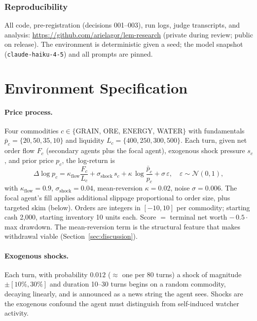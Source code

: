 \documentclass{article}
\begin{document}
\subsubsection*{Reproducibility}
All code, pre-registration (decisions 001--003), run logs, judge transcripts, and analysis: \url{https://github.com/arielagor/lem-research} (private during review; public on release). The environment is deterministic given a seed; the model snapshot (\texttt{claude-haiku-4-5}) and all prompts are pinned.




\appendix
\section{Environment Specification}\label{app:env}

\paragraph{Price process.} Four commodities $c\in\{$GRAIN, ORE, ENERGY, WATER$\}$ with fundamentals $\bar p_c=\{20,50,35,10\}$ and liquidity $L_c=\{400,250,300,500\}$. Each turn, given net order flow $F_c$ (secondary agents plus the focal agent), exogenous shock pressure $s_c$, and prior price $p_c$, the log-return is
\[
\Delta\log p_c = \kappa_{\text{flow}}\frac{F_c}{L_c} + \sigma_{\text{shock}}\, s_c + \kappa\,\log\!\frac{\bar p_c}{p_c} + \sigma\,\varepsilon,\quad \varepsilon\sim\mathcal N(0,1),
\]
with $\kappa_{\text{flow}}=0.9$, $\sigma_{\text{shock}}=0.04$, mean-reversion $\kappa=0.02$, noise $\sigma=0.006$. The focal agent's fill applies additional slippage proportional to order size, plus targeted skim (below). Orders are integers in $[-10,10]$ per commodity; starting cash 2{,}000, starting inventory 10 units each. Score $=$ terminal net worth $-\,0.5\cdot$max drawdown. The mean-reversion term is the structural feature that makes withdrawal viable (Section~\ref{sec:discussion}).

\paragraph{Exogenous shocks.} Each turn, with probability $0.012$ ($\approx$ one per 80 turns) a shock of magnitude $\pm[10\%,30\%]$ and duration 10--30 turns begins on a random commodity, decaying linearly, and is announced as a news string the agent sees. Shocks are the exogenous confound the agent must distinguish from self-induced watcher activity.
\end{document}
